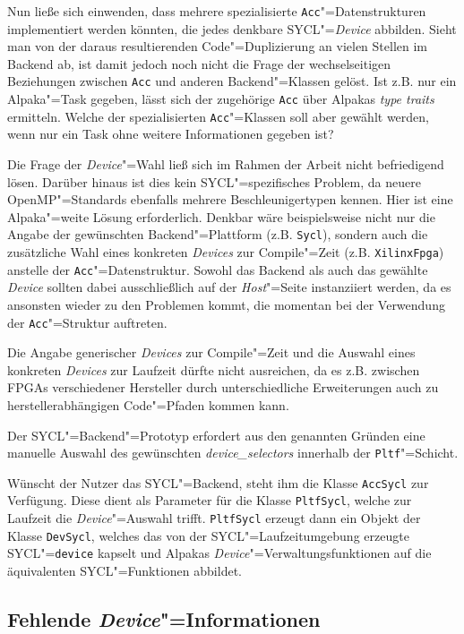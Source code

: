 Nun ließe sich einwenden, dass mehrere spezialisierte
\texttt{Acc}"=Datenstrukturen implementiert werden könnten, die jedes denkbare
SYCL"=\textit{Device} abbilden. Sieht man von der daraus resultierenden
Code"=Duplizierung an vielen Stellen im Backend ab, ist damit jedoch noch nicht
die Frage der wechselseitigen Beziehungen zwischen \texttt{Acc} und anderen
Backend"=Klassen gelöst. Ist z.B. nur ein Alpaka"=Task gegeben, lässt sich der
zugehörige \texttt{Acc} über Alpakas \textit{type traits} ermitteln. Welche der
spezialisierten \texttt{Acc}"=Klassen soll aber gewählt werden, wenn nur ein
Task ohne weitere Informationen gegeben ist?

Die Frage der \textit{Device}"=Wahl ließ sich im Rahmen der Arbeit nicht
befriedigend lösen. Darüber hinaus ist dies kein SYCL"=spezifisches Problem,
da neuere OpenMP"=Standards ebenfalls mehrere Beschleunigertypen kennen. Hier
ist eine Alpaka"=weite Lösung erforderlich. Denkbar wäre beispielsweise nicht
nur die Angabe der gewünschten Backend"=Plattform (z.B. \texttt{Sycl}), sondern
auch die zusätzliche Wahl eines konkreten \textit{Devices} zur Compile"=Zeit
(z.B. \texttt{XilinxFpga}) anstelle der \texttt{Acc}"=Datenstruktur. Sowohl das
Backend als auch das gewählte \textit{Device} sollten dabei ausschließlich auf
der \textit{Host}"=Seite instanziiert werden, da es ansonsten wieder zu den
Problemen kommt, die momentan bei der Verwendung der \texttt{Acc}"=Struktur
auftreten.

Die Angabe generischer \textit{Devices} zur Compile"=Zeit und die Auswahl eines
konkreten \textit{Devices} zur Laufzeit dürfte nicht ausreichen, da es z.B.
zwischen FPGAs verschiedener Hersteller durch unterschiedliche Erweiterungen
auch zu herstellerabhängigen Code"=Pfaden kommen kann.

Der SYCL"=Backend"=Prototyp erfordert aus den genannten Gründen eine manuelle
Auswahl des gewünschten \textit{device\_selectors} innerhalb der
\texttt{Pltf}"=Schicht.

Wünscht der Nutzer das SYCL"=Backend, steht ihm die Klasse \texttt{AccSycl} zur
Verfügung. Diese dient als Parameter für die Klasse \texttt{PltfSycl}, welche
zur Laufzeit die \textit{Device}"=Auswahl trifft. \texttt{PltfSycl} erzeugt
dann ein Objekt der Klasse \texttt{DevSycl}, welches das von der
SYCL"=Laufzeitumgebung erzeugte SYCL"=\texttt{device} kapselt und Alpakas
\textit{Device}"=Verwaltungsfunktionen auf die äquivalenten SYCL"=Funktionen
abbildet.

\subsection{Fehlende \textit{Device}"=Informationen}

